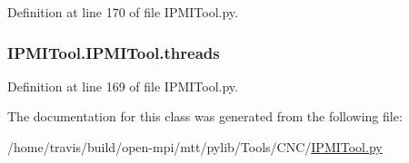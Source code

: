 Definition at line 170 of file I\-P\-M\-I\-Tool.\-py.

\hypertarget{class_i_p_m_i_tool_1_1_i_p_m_i_tool_a2f6ca8b0b509ba2c514b72312841b2d6}{
\subsubsection[{threads}]{\setlength{\rightskip}{0pt plus 5cm}I\-P\-M\-I\-Tool.\-I\-P\-M\-I\-Tool.\-threads}}\label{class_i_p_m_i_tool_1_1_i_p_m_i_tool_a2f6ca8b0b509ba2c514b72312841b2d6}


Definition at line 169 of file I\-P\-M\-I\-Tool.\-py.



The documentation for this class was generated from the following file\-:\begin{DoxyCompactItemize}
\item 
/home/travis/build/open-\/mpi/mtt/pylib/\-Tools/\-C\-N\-C/\hyperlink{_i_p_m_i_tool_8py}{I\-P\-M\-I\-Tool.\-py}\end{DoxyCompactItemize}
